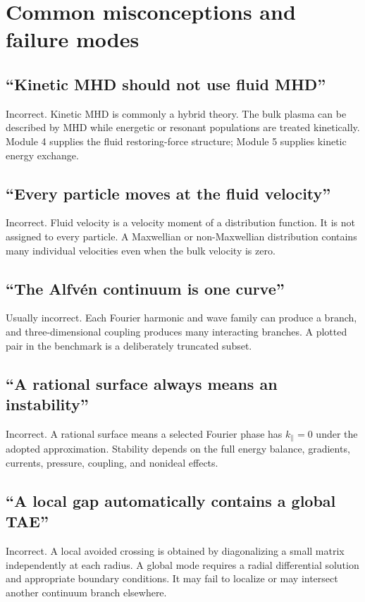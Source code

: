 \section{Common misconceptions and failure modes}
\label{sec:misconceptions}

\subsection{``Kinetic MHD should not use fluid MHD''}
Incorrect. Kinetic MHD is commonly a hybrid theory. The bulk plasma can be described by MHD while energetic or resonant populations are treated kinetically. Module 4 supplies the fluid restoring-force structure; Module 5 supplies kinetic energy exchange.

\subsection{``Every particle moves at the fluid velocity''}
Incorrect. Fluid velocity is a velocity moment of a distribution function. It is not assigned to every particle. A Maxwellian or non-Maxwellian distribution contains many individual velocities even when the bulk velocity is zero.

\subsection{``The Alfv\'en continuum is one curve''}
Usually incorrect. Each Fourier harmonic and wave family can produce a branch, and three-dimensional coupling produces many interacting branches. A plotted pair in the benchmark is a deliberately truncated subset.

\subsection{``A rational surface always means an instability''}
Incorrect. A rational surface means a selected Fourier phase has $k_\parallel=0$ under the adopted approximation. Stability depends on the full energy balance, gradients, currents, pressure, coupling, and nonideal effects.

\subsection{``A local gap automatically contains a global TAE''}
Incorrect. A local avoided crossing is obtained by diagonalizing a small matrix independently at each radius. A global mode requires a radial differential solution and appropriate boundary conditions. It may fail to localize or may intersect another continuum branch elsewhere.

